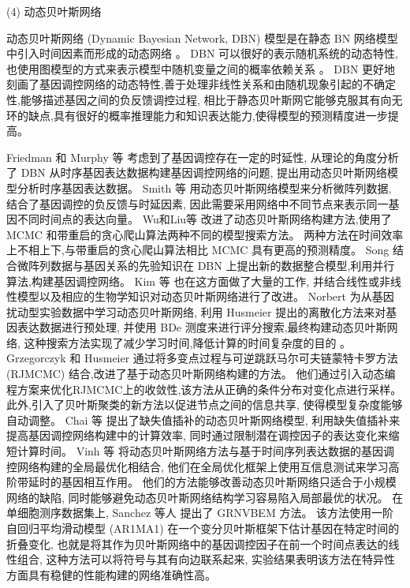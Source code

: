 (4) 动态贝叶斯网络

动态贝叶斯网络 (Dynamic Bayesian Network, DBN) 模型是在静态 BN 网络模型中引入时间因素而形成的动态网络 。
DBN 可以很好的表示随机系统的动态特性,也使用图模型的方式来表示模型中随机变量之间的概率依赖关系 。
DBN 更好地刻画了基因调控网络的动态特性,善于处理非线性关系和由随机现象引起的不确定性,能够描述基因之间的负反馈调控过程,
相比于静态贝叶斯网它能够克服其有向无环的缺点,具有很好的概率推理能力和知识表达能力,使得模型的预测精度进一步提高。

Friedman 和 Murphy 等  考虑到了基因调控存在一定的时延性,
从理论的角度分析了 DBN 从时序基因表达数据构建基因调控网络的问题, 提出用动态贝叶斯网络模型分析时序基因表达数据。
Smith 等  用动态贝叶斯网络模型来分析微阵列数据,
结合了基因调控的负反馈与时延因素, 因此需要采用网络中不同节点来表示同一基因不同时间点的表达向量。
Wu和Liu等  改进了动态贝叶斯网络构建方法,使用了 MCMC 和带重启的贪心爬山算法两种不同的模型搜索方法。 
两种方法在时间效率上不相上下,与带重启的贪心爬山算法相比 MCMC 具有更高的预测精度。
Song 结合微阵列数据与基因关系的先验知识在 DBN 上提出新的数据整合模型,利用并行算法,构建基因调控网络。
Kim 等  也在这方面做了大量的工作,
并结合线性或非线性模型以及相应的生物学知识对动态贝叶斯网络进行了改进。
Norbert  为从基因扰动型实验数据中学习动态贝叶斯网络,
利用 Husmeier  提出的离散化方法来对基因表达数据进行预处理,
并使用 BDe 测度来进行评分搜索,最终构建动态贝叶斯网络, 这种搜索方法实现了减少学习时间,降低计算的时间复杂度的目的 。
Grzegorczyk 和 Husmeier  通过将多变点过程与可逆跳跃马尔可夫链蒙特卡罗方法 (RJMCMC) 结合,改进了基于动态贝叶斯网络构建的方法。 他们通过引入动态编程方案来优化RJMCMC上的收敛性,该方法从正确的条件分布对变化点进行采样。 
此外,引入了贝叶斯聚类的新方法以促进节点之间的信息共享, 使得模型复杂度能够自动调整。
Chai 等  提出了缺失值插补的动态贝叶斯网络模型,
利用缺失值插补来提高基因调控网络构建中的计算效率,
同时通过限制潜在调控因子的表达变化来缩短计算时间。
Vinh 等  将动态贝叶斯网络方法与基于时间序列表达数据的基因调控网络构建的全局最优化相结合,
他们在全局优化框架上使用互信息测试来学习高阶带延时的基因相互作用。
他们的方法能够改善动态贝叶斯网络只适合于小规模网络的缺陷,
同时能够避免动态贝叶斯网络结构学习容易陷入局部最优的状况。
在单细胞测序数据集上, Sanchez 等人  提出了 GRNVBEM 方法。
该方法使用一阶自回归平均滑动模型 (AR1MA1) 在一个变分贝叶斯框架下估计基因在特定时间的折叠变化,
也就是将其作为贝叶斯网络中的基因调控因子在前一个时间点表达的线性组合,
这种方法可以将符号与其有向边联系起来,
实验结果表明该方法在特异性方面具有稳健的性能构建的网络准确性高。

